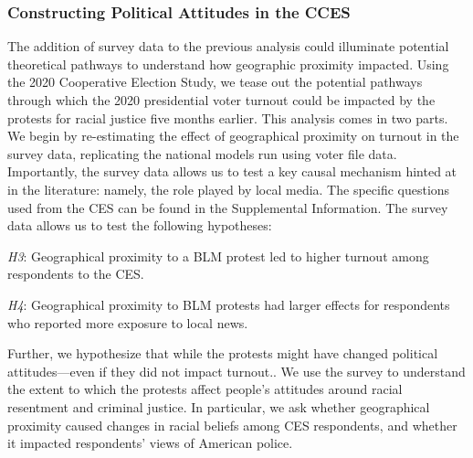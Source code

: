 \documentclass[
  12pt,
]{article}
\begin{document}
\hypertarget{constructing-political-attitudes-in-the-cces}{%
\subsubsection*{Constructing Political Attitudes in the CCES}\label{constructing-political-attitudes-in-the-cces}}

The addition of survey data to the previous analysis could illuminate potential theoretical pathways to understand how geographic proximity impacted. Using the 2020 Cooperative Election Study, we tease out the potential pathways through which the 2020 presidential voter turnout could be impacted by the protests for racial justice five months earlier. This analysis comes in two parts. We begin by re-estimating the effect of geographical proximity on turnout in the survey data, replicating the national models run using voter file data. Importantly, the survey data allows us to test a key causal mechanism hinted at in the literature: namely, the role played by local media. The specific questions used from the CES can be found in the Supplemental Information. The survey data allows us to test the following hypotheses:

\emph{H3}: Geographical proximity to a BLM protest led to higher turnout among respondents to the CES.

\emph{H4}: Geographical proximity to BLM protests had larger effects for respondents who reported more exposure to local news.

Further, we hypothesize that while the protests might have changed political attitudes---even if they did not impact turnout.. We use the survey to understand the extent to which the protests affect people's attitudes around racial resentment and criminal justice. In particular, we ask whether geographical proximity caused changes in racial beliefs among CES respondents, and whether it impacted respondents' views of American police.
\end{document}
